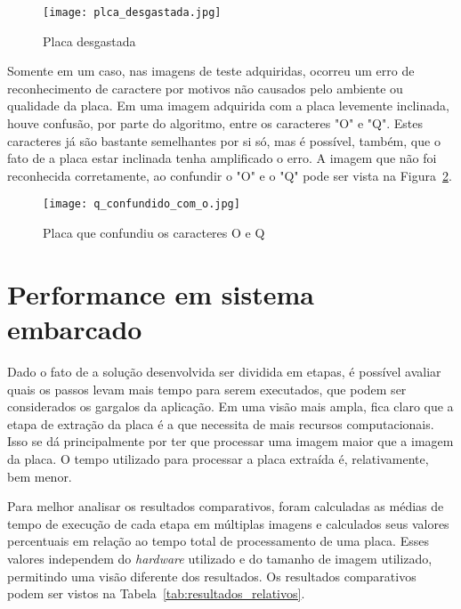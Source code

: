 \begin{figure}[H]
	\centering
	\texttt{[image: plca\_desgastada.jpg]}
	\caption{Placa desgastada}
	\label{fig:placa_desgastada}
\end{figure}

Somente em um caso, nas imagens de teste adquiridas, ocorreu um erro de reconhecimento de caractere por motivos não causados pelo ambiente ou qualidade da placa. Em uma imagem adquirida com a placa levemente inclinada, houve confusão, por parte do algoritmo, entre os caracteres "O" e "Q". Estes caracteres já são bastante semelhantes por si só, mas é possível, também, que o fato de a placa estar inclinada tenha amplificado o erro. A imagem que não foi reconhecida corretamente, ao confundir o "O" e o "Q" pode ser vista na Figura~\ref{fig:q_confundido_com_o}.

\begin{figure}[H]
	\centering
	\texttt{[image: q\_confundido\_com\_o.jpg]}
	\caption{Placa que confundiu os caracteres O e Q}
	\label{fig:q_confundido_com_o}
\end{figure}

\section{Performance em sistema embarcado}
\label{sec:performance_resultados}

Dado o fato de a solução desenvolvida ser dividida em etapas, é possível avaliar
quais os passos levam mais tempo para serem executados, que podem ser
considerados os gargalos da aplicação. Em uma visão mais ampla, fica claro que a
etapa de extração da placa é a que necessita de mais recursos computacionais.
Isso se dá principalmente por ter que processar uma imagem maior que a imagem da
placa. O tempo utilizado para processar a placa extraída é, relativamente, bem
menor.

Para melhor analisar os resultados comparativos, foram calculadas as médias de
tempo de execução de cada etapa em múltiplas imagens e calculados seus valores
percentuais em relação ao tempo total de processamento de uma placa. Esses
valores independem do \emph{hardware} utilizado e do tamanho de imagem
utilizado, permitindo uma visão diferente dos resultados. Os resultados
comparativos podem ser vistos na Tabela~\ref{tab:resultados_relativos}.

